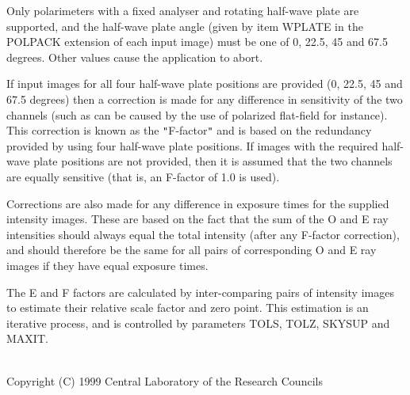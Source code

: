 \documentclass[twoside,11pt]{article}
\renewcommand{\_}{\texttt{\symbol{95}}}
\newcommand{\sstdiytopic}[2]{\item[{\hspace{-0.35em}#1\hspace{-0.35em}:}]
\mbox{} \\[1.3ex] #2}
\newcommand{\sstdiytopic}[2]{\item[{#1}] #2 }
\begin{document}
{{      Only polarimeters with a fixed analyser and rotating half-wave plate
      are supported, and the half-wave plate angle (given by item
      WPLATE in the POLPACK extension of each input image) must be one
      of 0, 22.5, 45 and 67.5 degrees. Other values cause the
      application to abort.

      If input images for all four half-wave plate positions are
      provided (0, 22.5, 45 and 67.5 degrees) then a correction is
      made for any difference in sensitivity of the two channels (such
      as can be caused by the use of polarized flat-field for
      instance). This correction is known as the {\tt "}F-factor{\tt "} and is
      based on the redundancy provided by using four half-wave plate
      positions. If images with the required half-wave plate positions
      are not provided, then it is assumed that the two channels are
      equally sensitive (that is, an F-factor of 1.0 is used).

      Corrections are also made for any difference in exposure times
      for the supplied intensity images. These are based on the fact
      that the sum of the O and E ray intensities should always equal
      the total intensity (after any F-factor correction), and should
      therefore be the same for all pairs of corresponding O and E ray
      images if they have equal exposure times.

      The E and F factors are calculated by inter-comparing pairs of
      intensity images to estimate their relative scale factor and
      zero point. This estimation is an iterative process, and is
      controlled by parameters TOLS, TOLZ, SKYSUP and MAXIT.
   }
   \sstdiytopic{
      Copyright
   }{
      Copyright (C) 1999 Central Laboratory of the Research Councils
   }
}
\end{document}
